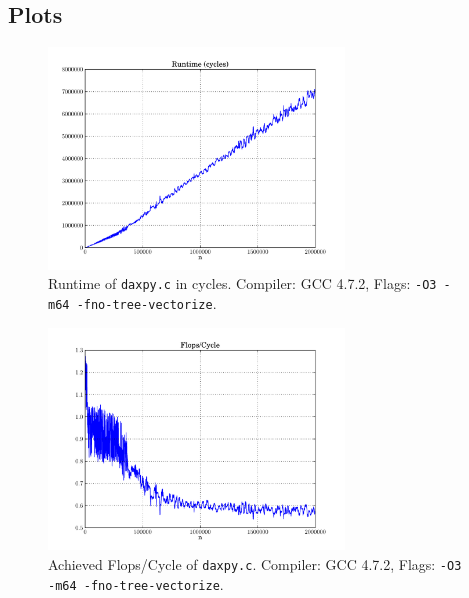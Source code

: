 \documentclass[portrait,a4paper]{article}
\begin{document}
\subsection{Plots}
\begin{figure}[H]
\centering
\includegraphics[width=0.7\textwidth]{daxpy/Runtimecycles.pdf}
\caption{Runtime of \lstinline{daxpy.c} in cycles. Compiler: GCC 4.7.2, Flags: \lstinline{-O3 -m64 -fno-tree-vectorize}.}
\end{figure}



\begin{figure}[H]
\centering
\includegraphics[width=0.7\textwidth]{daxpy/FlopsCycle.pdf}
\caption{Achieved Flops/Cycle of \lstinline{daxpy.c}. Compiler: GCC 4.7.2, Flags: \lstinline{-O3 -m64 -fno-tree-vectorize}.}
\end{figure}
\end{document}
